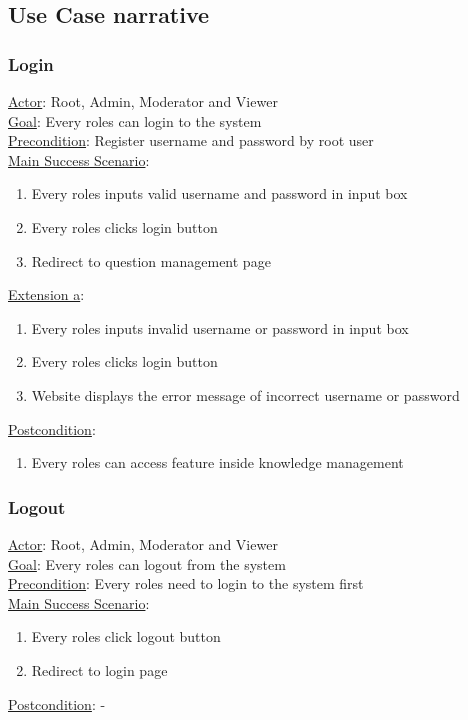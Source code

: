 \documentclass[12pt,oneside,openright,a4paper]{cpe-english-project}
\begin{document}
	\subsection{Use Case narrative}
	\subsubsection{Login}
	\underline{Actor}: Root, Admin, Moderator and Viewer\\
	\underline{Goal}: Every roles can login to the system\\
	\underline{Precondition}: Register username and password by root user\\
	\underline{Main Success Scenario}:
	\begin{enumerate}[label={\arabic*.}]
		\item Every roles inputs valid username and password in input box        
		\item Every roles clicks login button
		\item Redirect to question management page
	\end{enumerate}
	\underline{Extension a}:
	\begin{enumerate}[label={\arabic*.}]
		\item Every roles inputs invalid username or password in input box        
		\item Every roles clicks login button
		\item Website displays the error message of incorrect username or password
	\end{enumerate}
	\underline{Postcondition}: 
	\begin{enumerate}[label={\arabic*.}]
		\item Every roles can access feature inside knowledge management
	\end{enumerate}

	\subsubsection{Logout}
	\underline{Actor}: Root, Admin, Moderator and Viewer\\
	\underline{Goal}: Every roles can logout from the system\\
	\underline{Precondition}: Every roles need to login to the system first\\
	\underline{Main Success Scenario}:
	\begin{enumerate}[label={\arabic*.}]
		\item Every roles click logout button      
		\item Redirect to login page
	\end{enumerate}
	\underline{Postcondition}: -
\end{document}
